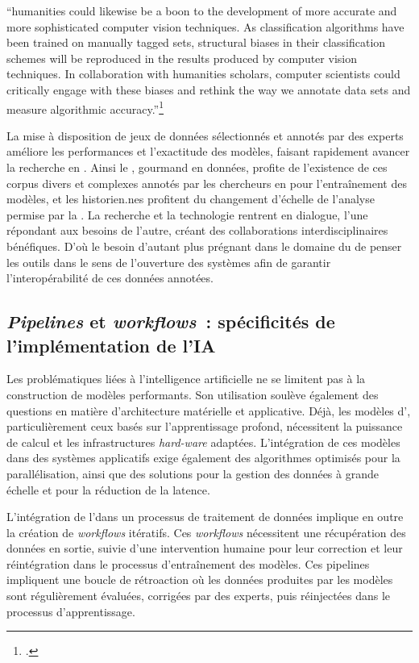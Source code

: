 \begin{kwote}
``humanities could likewise be a boon to the development of more accurate and more sophisticated computer vision techniques. As classification algorithms have been trained on manually tagged sets, structural biases in their classification schemes will be reproduced in the results produced by computer vision techniques. In collaboration with humanities scholars, computer scientists could critically engage with these biases and rethink the way we annotate data sets and measure algorithmic accuracy.''\footcite[p.12]{wevers_visual_2020}
\end{kwote}

La mise à disposition de jeux de données sélectionnés et annotés par des experts améliore les performances et l'exactitude des modèles, faisant rapidement avancer la recherche en \cv. Ainsi le \dl, gourmand en données, profite de l'existence de ces corpus divers et complexes annotés par les chercheurs en \shs pour l'entraînement des modèles, et les historien.nes profitent du changement d'échelle de l'analyse permise par la \cv. La recherche et la technologie rentrent en dialogue, l'une répondant aux besoins de l'autre, créant des collaborations interdisciplinaires bénéfiques. D'où le besoin d'autant plus prégnant dans le domaine du \ml de penser les outils dans le sens de l'ouverture des systèmes afin de garantir l'interopérabilité de ces données annotées.

\subsection{\emph{Pipelines} et \emph{workflows}~: spécificités de l'implémentation de l'IA}

Les problématiques liées à l'intelligence artificielle ne se limitent pas à la construction de modèles performants. Son utilisation soulève également des questions en matière d'architecture matérielle et applicative. Déjà, les modèles d'\ia, particulièrement ceux basés sur l'apprentissage profond, nécessitent la puissance de calcul et les infrastructures \textit{hard-ware} adaptées. L'intégration de ces modèles dans des systèmes applicatifs exige également des algorithmes optimisés pour la parallélisation, ainsi que des solutions pour la gestion des données à grande échelle et pour la réduction de la latence. 

L'intégration de l'\ia dans un processus de traitement de données implique en outre la création de \textit{workflows} itératifs. Ces \textit{workflows} nécessitent une récupération des données en sortie, suivie d'une intervention humaine pour leur correction et leur réintégration dans le processus d'entraînement des modèles. Ces pipelines impliquent une boucle de rétroaction où les données produites par les modèles sont régulièrement évaluées, corrigées par des experts, puis réinjectées dans le processus d'apprentissage.

